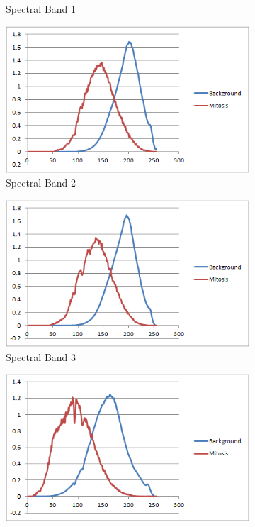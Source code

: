\documentclass[10pt,twocolumn,letterpaper]{article}
\begin{document}
\begin{figure}[b]
\begin{subfigure}[b]{0.22\textwidth}
		\caption*{Spectral Band 1}
	\end{subfigure}
	\begin{subfigure}[b]{0.22\textwidth}
		\includegraphics[width=\textwidth]{diagrams/Band2.png}
		\caption*{Spectral Band 2}
	\end{subfigure}
	\begin{subfigure}[b]{0.22\textwidth}
		\includegraphics[width=\textwidth]{diagrams/Band3.png}
		\caption*{Spectral Band 3}
	\end{subfigure}
	\begin{subfigure}[b]{0.22\textwidth}
		\includegraphics[width=\textwidth]{diagrams/Band4.png}

\end{subfigure}
\end{figure}
\end{document}

